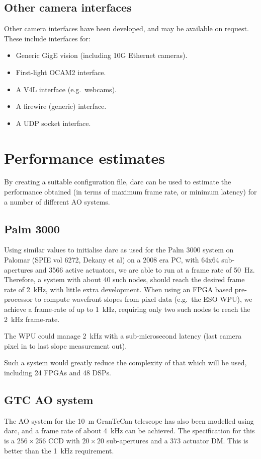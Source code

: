 \documentclass[a4,10pt]{article}
\begin{document}
\subsection{Other camera interfaces}
Other camera interfaces have been developed, and may be available on
request.  These include interfaces for:
\begin{itemize}
\item Generic GigE vision (including 10G Ethernet cameras).
\item First-light OCAM2 interface.
\item A V4L interface (e.g.\ webcams).
\item A firewire (generic) interface.
\item A UDP socket interface.
\end{itemize}

\section{Performance estimates}
By creating a suitable configuration file, darc can be used to
estimate the performance obtained (in terms of maximum frame rate, or
minimum latency) for a number of different AO systems.

\subsection{Palm 3000}
Using similar values to initialise darc as used for the Palm 3000
system on Palomar (SPIE vol 6272, Dekany et al) on a 2008 era PC,
with 64x64 sub-apertures and 3566 active actuators, we are able to run
at a frame rate of 50~Hz.  Therefore, a system with about 40 such
nodes, should reach the desired frame rate of 2~kHz, with little extra
development.  When using an FPGA based pre-processor to compute
wavefront slopes from pixel data (e.g.\ the ESO WPU), we achieve a
frame-rate of up to 1~kHz, requiring only two such nodes to reach the
2~kHz frame-rate.

The WPU could manage 2~kHz with a sub-microsecond latency (last camera
pixel in to last slope measurement out).

Such a system would greatly reduce the complexity of that which will
be used, including 24 FPGAs and 48 DSPs.

\subsection{GTC AO system}
The AO system for the 10~m GranTeCan telescope has also been modelled
using darc, and a frame rate of about 4~kHz can be achieved.  The
specification for this is a $256\times256$ CCD with $20\times20$
sub-apertures and a 373 actuator DM.  This is better than the 1~kHz
requirement.
\end{document}
